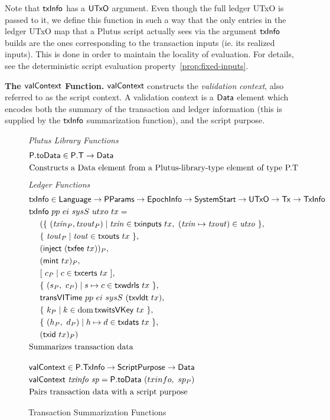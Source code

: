     Note that $\mathsf{txInfo}$ has a $\mathsf{UTxO}$ argument. Even though the full ledger UTxO
    is passed to it, we define this function in such a way that the only
    entries in the ledger UTxO map that a Plutus script
    actually sees via the argument $\mathsf{txInfo}$ builds are the ones corresponding to the transaction
    inputs (ie. its realized inputs). This is done in order to maintain the locality of
    evaluation. For details, see the deterministic script evaluation property~\ref{prop:fixed-inputs}.

\textbf{The $\mathsf{valContext}$ Function.}
    $\mathsf{valContext}$ constructs the \emph{validation context}, also referred to as the
    script context. A validation context is
    a $\mathsf{Data}$ element which encodes both the summary of the transaction and ledger information
    (this is supplied by the $\mathsf{txInfo}$ summarization function), and the script purpose.

\begin{figure}
  \emph{Plutus Library Functions}
  \begin{align*}
      &\mathsf{P.toData} \in \mathsf{P.T} \to \mathsf{Data} \\
      &\text{Constructs a Data element from a Plutus-library-type element of type P.T}
  \end{align*}
    \emph{Ledger Functions}
    \begin{align*}
        &\fun{txInfo} \in \Language \to \PParams \to \EpochInfo \to \SystemStart \to \UTxO \to \Tx \to \TxInfo \\
        &\fun{txInfo}~ pp~ ei~ sysS~ utxo~tx = \\
        & ~~~~ (\{~(\var{txin}_P, \var{txout}_P) \mid \var{txin}\in \fun{txinputs}~tx,~(\var{txin}\mapsto\var{txout})\in\var{utxo}~\}, \\
        & ~~~~ \{~\var{tout}_P\mid\var{tout}\in\fun{txouts}~{tx}~\} , \\
        & ~~~~ (\fun{inject}~(\fun{txfee}~{tx}))_P, \\
        & ~~~~ (\fun{mint}~{tx})_P , \\
        & ~~~~ [~ c_P \mid c \in \fun{txcerts}~{tx} ~] , \\
        & ~~~~ \{~(s_P,~c_P)\mid s\mapsto c \in \fun{txwdrls}~{tx}~\} , \\
        & ~~~~ \fun{transVITime} ~pp ~ei~ sysS~ (\fun{txvldt}~tx)  , \\
        & ~~~~ \{~k_P\mid k \in \dom \fun{txwitsVKey}~{tx}~\} , \\
        & ~~~~ \{~(h_P,~d_P)\mid h\mapsto d \in \fun{txdats}~{tx}~\} , \\
        & ~~~~ (\fun{txid}~{tx})_P) \\
        &\text{Summarizes transaction data}
        \nextdef
        &\fun{valContext} \in \type{P.TxInfo} \to \ScriptPurpose \to \Data \\
        &\fun{valContext}~\var{txinfo}~\var{sp} = \fun{P.toData}~(txinfo,~sp_P) \\
        &\text{Pairs transaction data with a script purpose}
    \end{align*}
  \caption{Transaction Summarization Functions}
  \label{fig:txinfo-funcs}
\end{figure}
